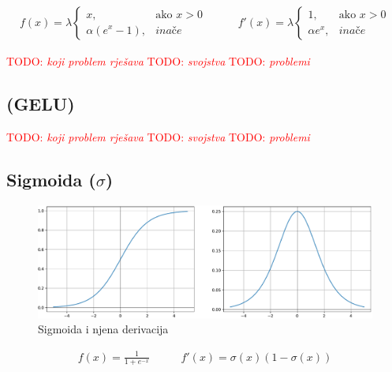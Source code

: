 \documentclass[times, utf8, diplomski]{fer}
\def\otherwise{\textit{inače}}
\def\TODO#1{\noindent\textcolor{red}{TODO: \textit{#1}}\newline}
\def\todo#1{\TODO{#1}}
\def\todoimg#1{\begin{center} \textcolor{red}{\big[ IMAGE: \textit{#1} \big]} \end{center}}
\begin{document}
\begin{equation}
\begin{split}
f(x) = \lambda
\begin{cases}
x,					& \text{ako } x > 0 \\
\alpha (e^x - 1),	& \otherwise
\end{cases}
\end{split}
\qquad
\begin{split}
f'(x) = \lambda
\begin{cases}
1,	 		& \text{ako } x > 0 \\
\alpha e^x,	& \otherwise
\end{cases}
\end{split}
\end{equation}

\todo{koji problem rješava}
\todo{svojstva}
\todo{problemi}

\subsection{(GELU)}

\todoimg{}

\todo{koji problem rješava}
\todo{svojstva}
\todo{problemi}

\subsection{Sigmoida ($\sigma $)}

\begin{figure}[H]
\includegraphics[width=\textwidth]{Sigmoid.pdf}
\centering
\caption{Sigmoida i njena derivacija}
\label{fig:sigmoid}
\end{figure}

\begin{equation}
\label{eq:sigmoid}
\begin{split}
f(x) = \frac{1}{1+e^{-x}}
\end{split}
\qquad
\begin{split}
f'(x) = \sigma(x)(1-\sigma(x))
\end{split}
\end{equation}
\end{document}
